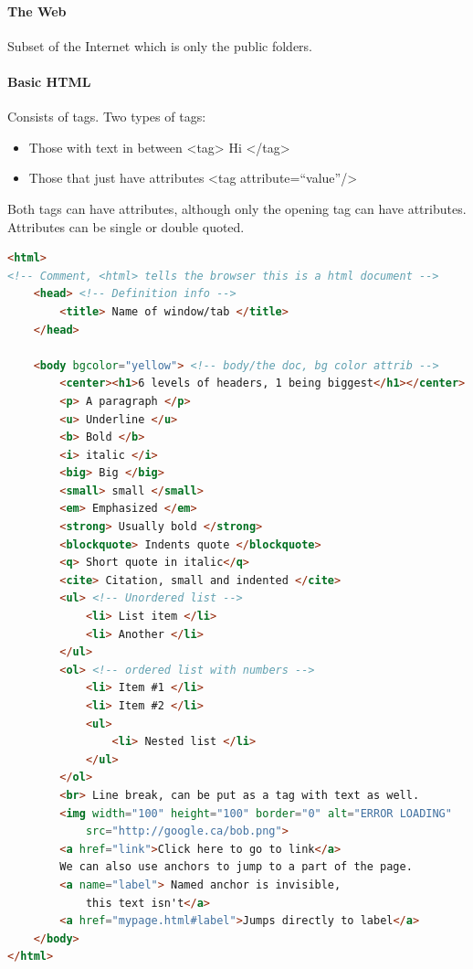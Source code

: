 \documentclass[12 pt]{article}
\begin{document}
\paragraph{The Web}Subset of the Internet which is only the public folders.
\paragraph{Basic HTML} Consists of tags. Two types of tags:
\begin{itemize}
\item Those with text in between <tag> Hi </tag>
\item Those that just have attributes <tag attribute=``value''/>
\end{itemize}
Both tags can have attributes, although only the opening tag can have attributes. Attributes can be single or double quoted. 
\begin{lstlisting}[language=html]
<html>
<!-- Comment, <html> tells the browser this is a html document -->
    <head> <!-- Definition info -->
        <title> Name of window/tab </title>
    </head>

    <body bgcolor="yellow"> <!-- body/the doc, bg color attrib -->
        <center><h1>6 levels of headers, 1 being biggest</h1></center>
        <p> A paragraph </p>
        <u> Underline </u>
        <b> Bold </b>
        <i> italic </i>
        <big> Big </big>
        <small> small </small>
        <em> Emphasized </em>
        <strong> Usually bold </strong>
        <blockquote> Indents quote </blockquote>
        <q> Short quote in italic</q>
        <cite> Citation, small and indented </cite>
        <ul> <!-- Unordered list -->
            <li> List item </li>
            <li> Another </li>
        </ul>
        <ol> <!-- ordered list with numbers -->
            <li> Item #1 </li>
            <li> Item #2 </li>
            <ul>
                <li> Nested list </li>
            </ul>
        </ol>
        <br> Line break, can be put as a tag with text as well.
        <img width="100" height="100" border="0" alt="ERROR LOADING"
            src="http://google.ca/bob.png">
        <a href="link">Click here to go to link</a>
        We can also use anchors to jump to a part of the page.
        <a name="label"> Named anchor is invisible,
            this text isn't</a>
        <a href="mypage.html#label">Jumps directly to label</a>
    </body>
</html>
\end{lstlisting}
\end{document}
